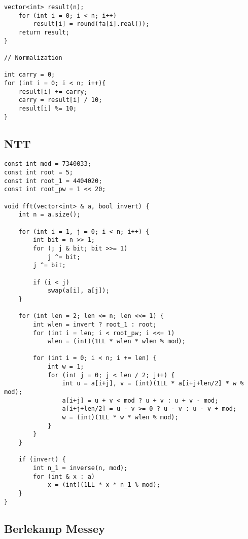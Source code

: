 \documentclass[10pt]{article}
\begin{document}
\begin{multicols*}{2}
\begin{lstlisting}[style=compactcpp]
    vector<int> result(n);
    for (int i = 0; i < n; i++)
        result[i] = round(fa[i].real());
    return result;
}

// Normalization

int carry = 0;
for (int i = 0; i < n; i++){
    result[i] += carry;
    carry = result[i] / 10;
    result[i] %= 10;
}

\end{lstlisting}

\subsection{NTT}

\begin{lstlisting}[style=compactcpp]
const int mod = 7340033;
const int root = 5;
const int root_1 = 4404020;
const int root_pw = 1 << 20;

void fft(vector<int> & a, bool invert) {
    int n = a.size();

    for (int i = 1, j = 0; i < n; i++) {
        int bit = n >> 1;
        for (; j & bit; bit >>= 1)
            j ^= bit;
        j ^= bit;

        if (i < j)
            swap(a[i], a[j]);
    }

    for (int len = 2; len <= n; len <<= 1) {
        int wlen = invert ? root_1 : root;
        for (int i = len; i < root_pw; i <<= 1)
            wlen = (int)(1LL * wlen * wlen % mod);

        for (int i = 0; i < n; i += len) {
            int w = 1;
            for (int j = 0; j < len / 2; j++) {
                int u = a[i+j], v = (int)(1LL * a[i+j+len/2] * w % mod);
                a[i+j] = u + v < mod ? u + v : u + v - mod;
                a[i+j+len/2] = u - v >= 0 ? u - v : u - v + mod;
                w = (int)(1LL * w * wlen % mod);
            }
        }
    }

    if (invert) {
        int n_1 = inverse(n, mod);
        for (int & x : a)
            x = (int)(1LL * x * n_1 % mod);
    }
}
\end{lstlisting}

\subsection{Berlekamp Messey}


\end{multicols*}
\end{document}
